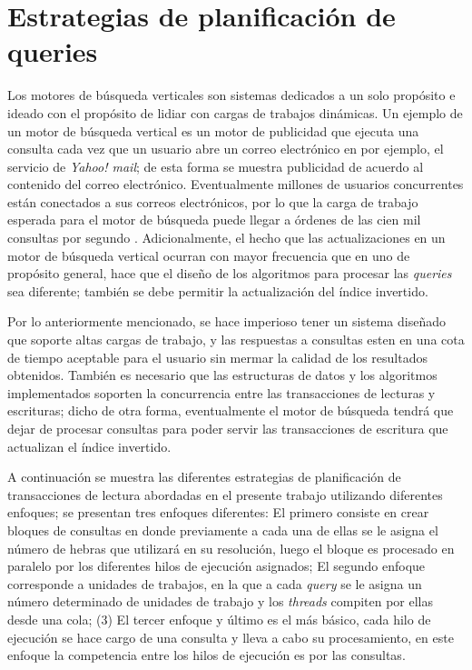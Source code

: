 \chapter{Estrategias de planificación de queries}
\label{cap:planificacion}
Los motores de búsqueda verticales son sistemas dedicados a un solo propósito e ideado con el propósito de lidiar con cargas de trabajos dinámicas. Un ejemplo de un motor de búsqueda vertical es un motor de publicidad que ejecuta una consulta cada vez que un usuario abre un correo electrónico en por ejemplo, el servicio de \textit{Yahoo! mail}; de esta forma se muestra publicidad de acuerdo al contenido del correo electrónico. Eventualmente millones de usuarios concurrentes están conectados a sus correos electrónicos, por lo que la carga de trabajo esperada para el motor de búsqueda puede llegar a órdenes de las cien mil consultas por segundo \citep{Gil-Costa:2013}. Adicionalmente, el hecho que las actualizaciones en un motor de búsqueda vertical ocurran con mayor frecuencia que en uno de propósito general, hace que el diseño de los algoritmos para procesar las \textit{queries} sea diferente; también se debe permitir la actualización del índice invertido.

Por lo anteriormente mencionado, se hace imperioso tener un sistema diseñado que soporte altas cargas de trabajo, y las respuestas a consultas esten en una cota de tiempo aceptable para el usuario sin mermar la calidad de los resultados obtenidos. También es necesario que las estructuras de datos y los algoritmos implementados soporten la concurrencia entre las transacciones de lecturas y escrituras; dicho de otra forma, eventualmente el motor de búsqueda tendrá que dejar de procesar consultas para poder servir las transacciones de escritura que actualizan el índice invertido.

A continuación se muestra las diferentes estrategias de planificación de transacciones de lectura abordadas en el presente trabajo utilizando diferentes enfoques; se presentan tres enfoques diferentes: El primero consiste en crear bloques de consultas en donde previamente a cada una de ellas se le asigna el número de hebras que utilizará en su resolución, luego el bloque es procesado en paralelo por los diferentes hilos de ejecución asignados; El segundo enfoque corresponde a unidades de trabajos, en la que a cada \textit{query} se le asigna un número determinado de unidades de trabajo y los \textit{threads} compiten por ellas desde una cola; (3) El tercer enfoque y último es el más básico, cada hilo de ejecución se hace cargo de una consulta y lleva a cabo su procesamiento, en este enfoque la competencia entre los hilos de ejecución es por las consultas. 


